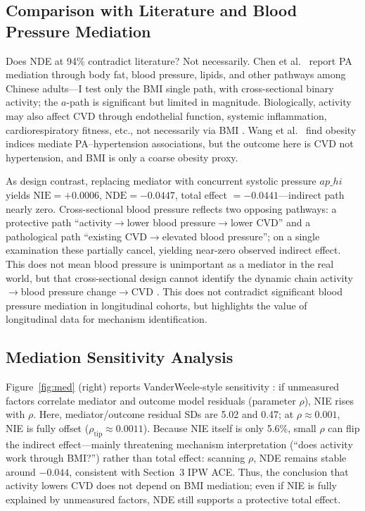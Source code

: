 \documentclass[12pt,a4paper]{article}
\begin{document}
\subsection{Comparison with Literature and Blood Pressure Mediation}

Does NDE at 94\% contradict literature? Not necessarily. Chen et al.\ \cite{chen2023pa} report PA mediation through body fat, blood pressure, lipids, and other pathways among Chinese adults---I test only the BMI single path, with cross-sectional binary activity; the $a$-path is significant but limited in magnitude. Biologically, activity may also affect CVD through endothelial function, systemic inflammation, cardiorespiratory fitness, etc., not necessarily via BMI \cite{bjsports2023crf,srep2025stiffness}. Wang et al.\ \cite{wang2023obesity} find obesity indices mediate PA--hypertension associations, but the outcome here is CVD not hypertension, and BMI is only a coarse obesity proxy.

As design contrast, replacing mediator with concurrent systolic pressure $ap\_hi$ yields $\mathrm{NIE}=+0.0006$, $\mathrm{NDE}=-0.0447$, total effect $=-0.0441$---indirect path nearly zero. Cross-sectional blood pressure reflects two opposing pathways: a protective path ``activity$\to$lower blood pressure$\to$lower CVD'' and a pathological path ``existing CVD$\to$elevated blood pressure''; on a single examination these partially cancel, yielding near-zero observed indirect effect. This does not mean blood pressure is unimportant as a mediator in the real world, but that cross-sectional design cannot identify the dynamic chain activity$\to$blood pressure change$\to$CVD \cite{srep2025stiffness,hernan2024whatif}. This does not contradict significant blood pressure mediation in longitudinal cohorts, but highlights the value of longitudinal data for mechanism identification.

\subsection{Mediation Sensitivity Analysis}

Figure~\ref{fig:med} (right) reports VanderWeele-style sensitivity \cite{vanderweele2015explanation}: if unmeasured factors correlate mediator and outcome model residuals (parameter $\rho$), NIE rises with $\rho$. Here, mediator/outcome residual SDs are 5.02 and 0.47; at $\rho\approx 0.001$, NIE is fully offset ($\rho_{\text{tip}}\approx 0.0011$). Because NIE itself is only 5.6\%, small $\rho$ can flip the indirect effect---mainly threatening mechanism interpretation (``does activity work through BMI?'') rather than total effect: scanning $\rho$, NDE remains stable around $-0.044$, consistent with Section~3 IPW ACE. Thus, the conclusion that activity lowers CVD does not depend on BMI mediation; even if NIE is fully explained by unmeasured factors, NDE still supports a protective total effect.
\end{document}
